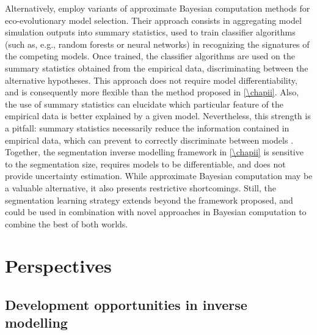 % 
Alternatively, \cite{Sukumaran2016,Skeels2019,Skeels2022} employ variants of approximate Bayesian computation methods \citep{Csillery2010} for eco-evolutionary model selection. Their approach consists in aggregating model simulation outputs into summary statistics, used to train classifier algorithms (such as, e.g., random forests or neural networks) in recognizing the signatures of the competing models. Once trained, the classifier algorithms are used on the summary statistics obtained from the empirical data, discriminating between the alternative hypotheses. 
% 
This approach does not require model differentiability, and is consequently more flexible than the method proposed in \cref{\chapii}. Also, the use of summary statistics can elucidate which particular feature of the empirical data is better explained by a given model. 
% 
Nevertheless, this strength is a pitfall: summary statistics necessarily reduce the information contained in empirical data, which can prevent to correctly discriminate between models \citep{Csillery2010}.
% 
Together, the segmentation inverse modelling framework in \cref{\chapii} is sensitive to the segmentation size, requires models to be differentiable, and does not provide uncertainty estimation. While approximate Bayesian computation may be a valuable alternative, it also presents restrictive shortcomings. Still, the segmentation learning strategy extends beyond the framework proposed, and could be used in combination with novel approaches in Bayesian computation to combine the best of both worlds.

\section{Perspectives}

\subsection{Development opportunities in inverse modelling}

